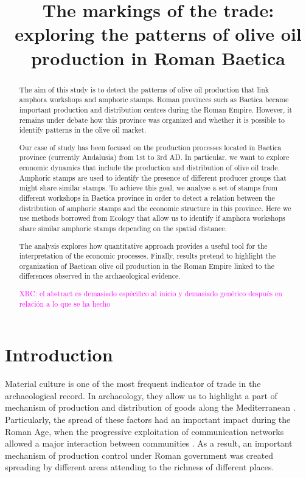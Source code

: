 \documentclass[review]{elsarticle}
\newcommand{\memo}[2]{\textcolor{#1}{#2}}
\newcommand{\xavi}[1]{\memo{magenta}{XRC: #1\\}}
\begin{document}
\title{The markings of the trade: exploring the patterns of olive oil production in Roman Baetica}


\begin{frontmatter}

\begin{abstract}

The aim of this study is to detect the patterns of olive oil production that link amphora workshops and amphoric stamps. Roman provinces such as Baetica became important production and distribution centres during the Roman Empire. However, it remains under debate how this province was organized and whether it is possible to identify patterns in the olive oil market. 

Our case of study has been focused on the production processes located in Baetica province (currently Andalusia) from 1st to 3rd AD. In particular, we want to explore economic dynamics that include the production and distribution of olive oil trade. Amphoric stamps are used to identify the presence of different producer groups that might share similar stamps. To achieve this goal, we analyse a set of stamps from different workshops in Baetica province in order to detect a relation between the distribution of amphoric stamps and the economic structure in this province. Here we use methods borrowed from Ecology that allow us to identify if amphora workshops share similar amphoric stamps depending on the spatial distance. 

The analysis explores how quantitative approach provides a useful tool for the interpretation of the economic processes. Finally, results pretend to highlight the organization of Baetican olive oil production in the Roman Empire linked to the differences observed in the archaeological evidence.

\xavi{el abstract es demasiado espécifico al inicio y demasiado genérico después en relación a lo que se ha hecho}

\end{abstract}


\end{frontmatter}

\section{Introduction}


Material culture is one of the most frequent indicator of trade in the archaeological record. In archaeology, they allow us to highlight a part of mechanism of production and distribution of goods along the Mediterranean \citep{bevan_mediterranean_2014}. Particularly, the spread of these factors had an important impact during the Roman Age, when the progressive exploitation of communication networks allowed a major interaction between communities \citep{orengo_seeds_2016}. As a result, an important mechanism of production control under Roman government was created spreading by different areas attending to the richness of different places. 
\end{document}
